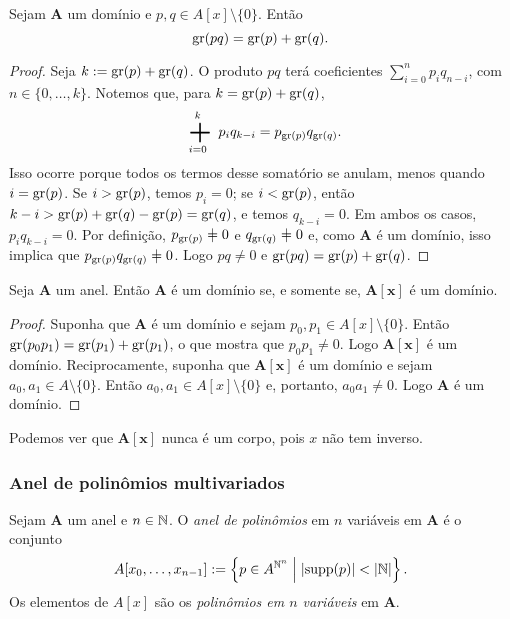 \begin{proposition}
Sejam $\bm A$ um domínio e $p,q \in A[x]\setminus\{0\}$. Então
	\begin{equation*}
	\operatorname{gr}(pq)=\operatorname{gr}(p)+\operatorname{gr}(q).
	\end{equation*}
\end{proposition}
\begin{proof}
Seja $k := \operatorname{gr}(p)+\operatorname{gr}(q)$. O produto $pq$ terá coeficientes $\sum_{i=0}^n p_i q_{n-i}$, com $n \in \{0,\ldots,k\}$. Notemos que, para $k = \operatorname{gr}(p)+\operatorname{gr}(q)$,
	\begin{equation*}
	\sum_{i=0}^k p_i q_{k-i} = p_{\g(p)}q_{\g(q)}.
	\end{equation*}
Isso ocorre porque todos os termos desse somatório se anulam, menos quando $i=\operatorname{gr}(p)$. Se $i>\operatorname{gr}(p)$, temos $p_i=0$; se $i<\operatorname{gr}(p)$, então $k-i > \operatorname{gr}(p)+\operatorname{gr}(q)-\operatorname{gr}(p) = \operatorname{gr}(q)$, e temos $q_{k-i}=0$. Em ambos os casos, $p_i q_{k-i}=0$. Por definição, $p_{\g(p)} \neq 0$ e $q_{\g(q)} \neq 0$ e, como $\bm A$ é um domínio, isso implica que $p_{\g(p)} q_{\g(q)} \neq 0$. Logo $pq \neq 0$ e $\operatorname{gr}(pq)=\operatorname{gr}(p)+\operatorname{gr}(q)$.
\end{proof}

\begin{proposition}
Seja $\bm A$ um anel. Então $\bm A$ é um domínio se, e somente se, $\bm{A[x]}$ é um domínio.
\end{proposition}
\begin{proof}
Suponha que $\bm A$ é um domínio e sejam $p_0,p_1 \in A[x]\setminus\{0\}$. Então $\operatorname{gr}(p_0p_1)=\operatorname{gr}(p_1)+\operatorname{gr}(p_1)$, o que mostra que $p_0p_1 \neq 0$. Logo $\bm{A[x]}$ é um domínio. Reciprocamente, suponha que $\bm{A[x]}$ é um domínio e sejam $a_0,a_1 \in A\setminus\{0\}$. Então $a_0,a_1 \in A[x]\setminus\{0\}$ e, portanto, $a_0a_1 \neq 0$. Logo $\bm A$ é um domínio.
\end{proof}

Podemos ver que $\bm{A[x]}$ nunca é um corpo, pois $x$ não tem inverso.

\subsubsection{Anel de polinômios multivariados}

\begin{definition}
Sejam $\bm A$ um anel e $n \in \mathbb{N}$. O \emph{anel de polinômios} em $n$ variáveis em $\bm A$ é o conjunto
	\begin{equation*}
	A[x_0,\ldots,x_{n-1}] := \left\{{p \in A^{\mathbb{N}^n}}\;\middle\vert\;{\left\lvert{\operatorname{supp}(p)}\right\rvert < \left\lvert{\mathbb{N}}\right\rvert}\right\}.
	\end{equation*}
Os elementos de $A[x]$ são os \emph{polinômios em $n$ variáveis} em $\bm A$.
\end{definition}


